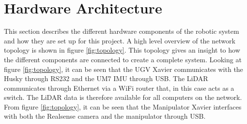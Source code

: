 

% 






  
\section{Hardware Architecture}\label{sec:M:Hardware}
This section describes the different hardware components of the robotic system and how they are set up for this project. A high level overview of the network topology is shown in figure \ref{fig:topology}. This topology gives an insight to how the different components are connected to create a complete system. Looking at figure \ref{fig:topology}, it can be seen that the UGV Xavier communicates with the Husky through RS232 and the UM7 IMU through USB. The LiDAR communicates through Ethernet via a WiFi router that, in this case acts as a switch. The LiDAR data is therefore available for all computers on the network. From figure \ref{fig:topology}, it can be seen that the Manipulator Xavier interfaces with both the Realsense camera and the manipulator through USB. 


